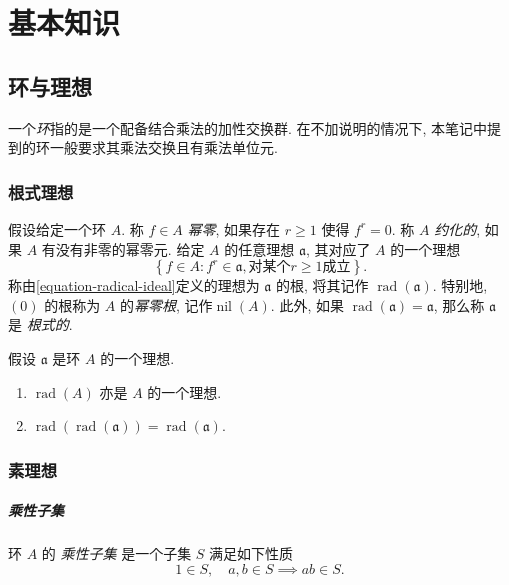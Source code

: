 \chapter{基本知识}

\section{环与理想}

一个\emph{环}指的是一个配备结合乘法的加性交换群.
在不加说明的情况下, 本笔记中提到的环一般要求其乘法交换且有乘法单位元.

\subsection{根式理想}

假设给定一个环 \( A \).
称 \( f \in A \) \emph{幂零}, 如果存在 \( r \geq 1 \) 使得 \( f^r = 0 \).
称 \( A \) \emph{约化的}, 如果 \( A \) 有没有非零的幂零元.
给定 \( A \) 的任意理想 \( \mathfrak{a} \), 其对应了 \( A \) 的一个理想
\begin{equation}
  \left\lbrace f \in A : f^r \in \mathfrak{a}, \text{对某个} r \geq 1
  \text{成立} \right\rbrace.
  \label{equation-radical-ideal}
\end{equation}
称由\eqref{equation-radical-ideal}定义的理想为 \( \mathfrak{a} \) 的根,
将其记作 \( \operatorname{rad}(\mathfrak{a}) \).
特别地, \( (0) \) 的根称为 \( A \) 的\emph{幂零根}, 记作\(
\operatorname{nil}(A) \).
此外, 如果 \( \operatorname{rad}(\mathfrak{a}) = \mathfrak{a} \), 那么称 \(
\mathfrak{a} \) 是 \emph{根式的}.

\begin{proposition}
  假设 \( \mathfrak{a} \) 是环 \( A \) 的一个理想.
  \begin{enumerate}
    \item \( \operatorname{rad}(A) \) 亦是 \( A \) 的一个理想.
    \item \( \operatorname{rad}(\operatorname{rad}(\mathfrak{a})) =
      \operatorname{rad}(\mathfrak{a}) \).
  \end{enumerate}
\end{proposition}

\subsection{素理想}

\paragraph{乘性子集}
环 \( A \) 的 \emph{乘性子集} 是一个子集 \( S \) 满足如下性质
\[
  1 \in S,\quad a, b \in S \implies ab \in S.
\]

